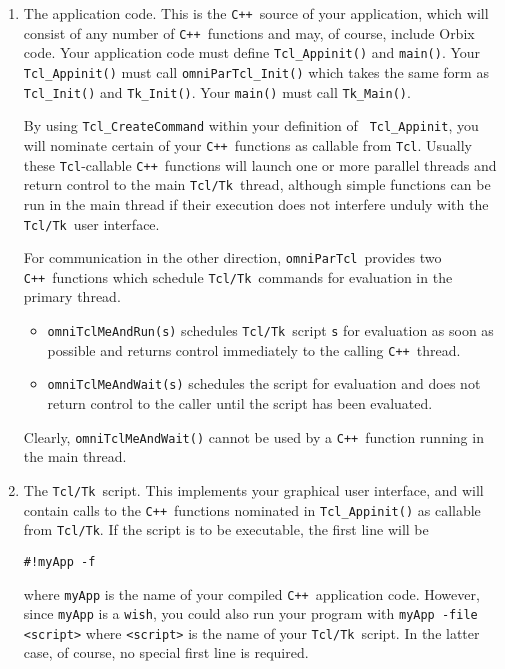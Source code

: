 \documentclass[11pt]{article}
\def\omniParTcl{{\tt omniParTcl}}
\def\tcltk{{\tt Tcl/Tk}}
\def\tcl{{\tt Tcl}}
\def\CXX{{\tt C++}}
\begin{document}
\begin{enumerate}

\item The application code.  This is the \CXX\ source of your
application, which will consist of any number of \CXX\ functions and
may, of course, include Orbix code.  Your application code must define
{\tt Tcl\_Appinit()} and {\tt main()}.  Your {\tt Tcl\_Appinit()} must
call {\tt omniParTcl\_Init()} which takes the same form as {\tt
Tcl\_Init()} and {\tt Tk\_Init()}.  Your {\tt main()} must call
{\tt Tk\_Main()}.

By using {\tt Tcl\_CreateCommand} within your definition of {\tt
Tcl\_Appinit}, you will nominate certain of your \CXX\ functions as
callable from \tcl.  Usually these \tcl-callable \CXX\ functions will
launch one or more parallel threads and return control to the main
\tcltk\ thread, although simple functions can be run in the main thread
if their execution does not interfere unduly with the \tcltk\ user
interface.

For communication in the other direction, \omniParTcl\ provides two
\CXX\ functions which schedule \tcltk\ commands for evaluation in the
primary thread.  

\begin{itemize}
\item
{\tt omniTclMeAndRun(s)} schedules \tcltk\ script {\tt s}
for evaluation as soon as possible and returns control
immediately to the calling \CXX\ thread.  
\item
{\tt omniTclMeAndWait(s)}
schedules the script for evaluation and does not return control to the
caller until the script has been evaluated.  
\end{itemize}

\noindent
Clearly, {\tt omniTclMeAndWait()} cannot be used by a
\CXX\ function running in the main thread.

\item

The \tcltk\ script.  This implements your graphical user interface, and
will contain calls to the \CXX\ functions nominated in {\tt Tcl\_Appinit()}
as callable from \tcltk.  If the script is to be executable, the first 
line will be

\bigskip
\verb|#!myApp -f|
\bigskip

\noindent
where {\tt myApp} is the name of your compiled \CXX\ application code.
However, since {\tt myApp} is a {\tt wish}, you could also run your
program with {\tt myApp -file <script>} where {\tt <script>} is the name
of your \tcltk\ script.  In the latter case, of course, no special first line
is required.

\end{enumerate}
\end{document}
